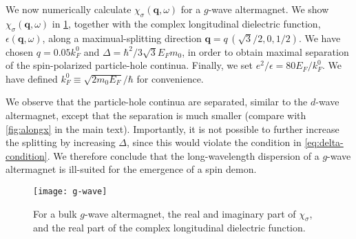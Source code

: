 \documentclass[aps,prb,reprint,twocolumns,superscriptaddress,nofootinbib]{revtex4-2}
\newcommand{\kF}{k_{F}}
\begin{document}
	
	
	We now numerically calculate $\chi_{\sigma}(\bm q,\omega)$ for a $g$-wave altermagnet. We show $\chi_{\sigma}(\bm q,\omega)$ in \cref{fig:g-wave}, together with the complex longitudinal dielectric function, $\epsilon(\bm q,\omega)$, along a maximual-splitting direction $\bm q = q\, \left(\sqrt{3}/2,0,1/2\right)$. We have chosen $q=0.05\kF^0$ and $\Delta ={\hbar^2}/{3\sqrt{3}E_F m_0 }$, in order to obtain maximal separation of the spin-polarized particle-hole continua. Finally, we set $e^2/\epsilon = 80 E_F/\kF^0$. We have defined $\kF^0\equiv \sqrt{2m_0E_F}/\hbar$ for convenience. 
	
	We observe that the particle-hole continua are separated, similar to the $d$-wave altermagnet, except that the separation is much smaller (compare with \cref{fig:alongx} in the main text). Importantly, it is not possible to further increase the splitting by increasing $\Delta$, since this would violate the condition in \cref{eq:delta-condition}. We therefore conclude that the long-wavelength dispersion of a $g$-wave altermagnet is ill-suited for the emergence of a spin demon.
	
	\begin{figure}
		\texttt{[image: g-wave]}
		\caption{For a bulk $g$-wave altermagnet, the real and imaginary part of $\chi_{\sigma}$, and the real part of the complex longitudinal dielectric function.}
		\label{fig:g-wave}
	\end{figure}
	
	
\end{document}
